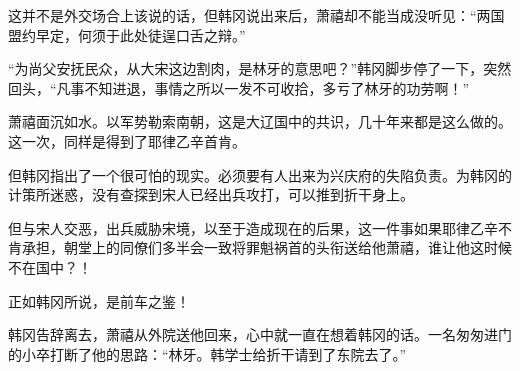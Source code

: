 这并不是外交场合上该说的话，但韩冈说出来后，萧禧却不能当成没听见：“两国盟约早定，何须于此处徒逞口舌之辩。”

“为尚父安抚民众，从大宋这边割肉，是林牙的意思吧？”韩冈脚步停了一下，突然回头，“凡事不知进退，事情之所以一发不可收拾，多亏了林牙的功劳啊！”

萧禧面沉如水。以军势勒索南朝，这是大辽国中的共识，几十年来都是这么做的。这一次，同样是得到了耶律乙辛首肯。

但韩冈指出了一个很可怕的现实。必须要有人出来为兴庆府的失陷负责。为韩冈的计策所迷惑，没有查探到宋人已经出兵攻打，可以推到折干身上。

但与宋人交恶，出兵威胁宋境，以至于造成现在的后果，这一件事如果耶律乙辛不肯承担，朝堂上的同僚们多半会一致将罪魁祸首的头衔送给他萧禧，谁让他这时候不在国中？！

正如韩冈所说，是前车之鉴！

韩冈告辞离去，萧禧从外院送他回来，心中就一直在想着韩冈的话。一名匆匆进门的小卒打断了他的思路：“林牙。韩学士给折干请到了东院去了。”
